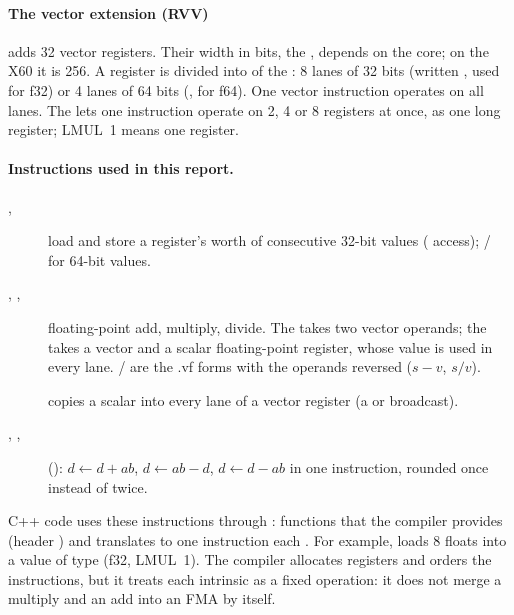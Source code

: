 \paragraph{The vector extension (RVV)} adds 32 vector registers. Their width in bits, the
, depends on the core; on the X60 it is 256. A register is divided into
 of the : 8 lanes of 32 bits (written , used for f32)
or 4 lanes of 64 bits (, for f64). One vector instruction operates on all lanes.
The   lets one instruction operate on 2, 4 or 8 registers at
once, as one long register; LMUL~1 means one register.

\paragraph{Instructions used in this report.}
\begin{description}
  \item[, ] load and store a register's worth of consecutive 32-bit
        values ( access); / for 64-bit values.
  \item[, , ] floating-point add, multiply, divide. The
         takes two vector operands; the  takes a vector and a
        scalar floating-point register, whose value is used in every lane.
        / are the .vf forms with the operands reversed
        ($s - v$, $s / v$).
  \item[] copies a scalar into every lane of a vector register (a
         or broadcast).
  \item[, , ]  ():
        $d \leftarrow d + a b$, $d \leftarrow a b - d$, $d \leftarrow d - a b$ in one
        instruction, rounded once instead of twice.
\end{description}
C++ code uses these instructions through : functions that the compiler
provides (header ) and translates to one instruction each
\autocite{rvv-intrinsics}. For example,
 loads 8 floats into a value of type 
(f32, LMUL~1). The compiler allocates registers and orders the instructions, but it treats
each intrinsic as a fixed operation: it does not merge a multiply and an add into an FMA by
itself.

